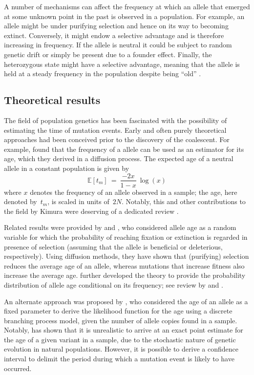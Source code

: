 A number of mechanisms can affect the frequency at which an allele that emerged at some unknown point in the past is observed in a population.
For example, an allele might be under purifying selection and hence on its way to becoming extinct.
Conversely, it might endow a selective advantage and is therefore increasing in frequency.
If the allele is neutral it could be subject to random genetic drift or simply be present due to a founder effect.
Finally, the heterozygous state might have a selective advantage, meaning that the allele is held at a steady frequency in the population despite being ``old'' \citep{Colombo:2007ba}.


%
\subsection{Theoretical results}
%

The field of population genetics has been fascinated with the possibility of estimating the time of mutation events.
Early and often purely theoretical approaches had been conceived prior to the discovery of the coalescent.
For example, \citet{Kimura:1973ug} found that the frequency of a allele can be used as an estimator for its age, which they derived in a diffusion process.
The expected age of a neutral allele in a constant population is given by
\begin{equation}\label{eq:intro_kimura_ohta}
	\mathbb{E}\left[t_m\right]~=~\frac{-2x}{1-x}~\log(x)
\end{equation}
where $x$ denotes the frequency of an allele observed in a sample; the age, here denoted by~$t_m$, is scaled in units of~$2N$.
Notably, this and other contributions to the field by Kimura were deserving of a dedicated review \citep{Watterson:1996wr}.

Related results were provided by \citet{Maruyama:1974ba} and \citet{Li:1975vj}, who considered allele age as a random variable for which the probability of reaching fixation or extinction is regarded in presence of selection (\ie assuming that the allele is beneficial or deleterious, respectively).
Using diffusion methods, they have shown that (purifying) selection reduces the average age of an allele, whereas mutations that increase fitness also increase the average age.
 further developed the theory to provide the probability distribution of allele age conditional on its frequency; see review by \citet{Slatkin:2000bi} and \citet{Slatkin:2000us}.

An alternate approach was proposed by \citet{Thompson:1976uf}, who considered the age of an allele as a fixed parameter to derive the likelihood function for the age using a discrete branching process model, given the number of allele copies found in a sample.
Notably, \citet{Thompson:1976uf} has shown that it is unrealistic to arrive at an exact point estimate for the age of a given variant in a sample, due to the stochastic nature of genetic evolution in natural populations.
However, it is possible to derive a confidence interval to delimit the period during which a mutation event is likely to have occurred.

